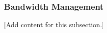 
\subsubsection{Bandwidth Management}
\label{subsubsec:design_5_8_bandwidth_management}

[Add content for this subsection.]
